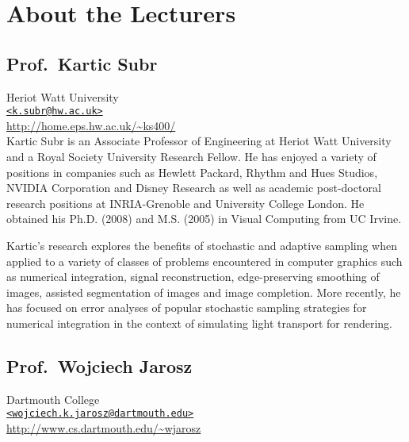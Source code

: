 \documentclass[11pt,fleqn]{book} %
\begin{document}
\clearpage



{}
\section*{About the Lecturers}

\subsection*{Prof.\ Kartic Subr}
Heriot Watt University\\
\href{mailto:fixme}{\texttt{<k.subr@hw.ac.uk>}}\\
\url{http://home.eps.hw.ac.uk/~ks400/}\\

Kartic Subr is an Associate Professor of Engineering at Heriot Watt University and a Royal Society University Research Fellow. He has enjoyed a variety of positions in companies such as Hewlett Packard, Rhythm and Hues Studios, NVIDIA Corporation and Disney Research as well as academic post-doctoral research positions at INRIA-Grenoble and University College London. He obtained his Ph.D. (2008) and M.S. (2005) in Visual Computing from UC Irvine. 

Kartic's research explores the benefits of stochastic and adaptive sampling when applied to a variety of classes of problems encountered in computer graphics such as numerical integration, signal reconstruction, edge-preserving smoothing of images, assisted segmentation of images and image completion. More recently, he has focused on error analyses of popular stochastic sampling strategies for numerical integration in the context of simulating light transport for rendering.

\bigskip

\subsection*{Prof.\ Wojciech Jarosz}
Dartmouth College\\
\href{mailto:wojciech.k.jarosz@dartmouth.edu}{\texttt{<wojciech.k.jarosz@dartmouth.edu>}}\\
\url{http://www.cs.dartmouth.edu/~wjarosz}\\
\end{document}
